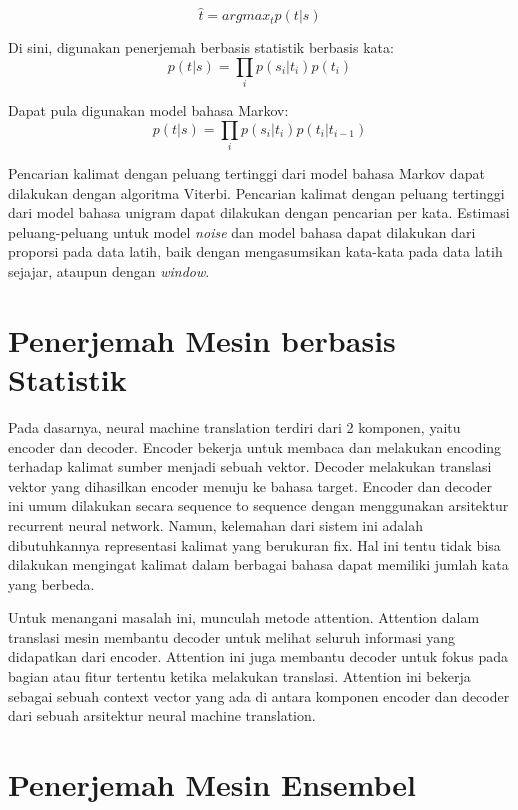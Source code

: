 \documentclass[conference]{IEEEtran}
\begin{document}
\begin{equation}
\hat{t} = argmax_t p(t|s)
\end{equation}

Di sini, digunakan penerjemah berbasis statistik berbasis kata:
\begin{equation}
p(t|s) = \prod_i p(s_i|t_i)p(t_i)
\end{equation}

Dapat pula digunakan model bahasa Markov:
\begin{equation}
p(t|s) = \prod_i p(s_i|t_i)p(t_i|t_{i-1})
\end{equation}

Pencarian kalimat dengan peluang tertinggi dari model bahasa Markov dapat dilakukan dengan algoritma Viterbi. Pencarian kalimat dengan peluang tertinggi dari model bahasa unigram dapat dilakukan dengan pencarian per kata. Estimasi peluang-peluang untuk model \textit{noise} dan model bahasa dapat dilakukan dari proporsi pada data latih, baik dengan mengasumsikan kata-kata pada data latih sejajar, ataupun dengan \textit{window}.

\section{Penerjemah Mesin berbasis Statistik}

Pada dasarnya, neural machine translation terdiri dari 2 komponen, yaitu encoder dan decoder. Encoder bekerja untuk membaca dan melakukan encoding terhadap kalimat sumber menjadi sebuah vektor. Decoder melakukan translasi vektor yang dihasilkan encoder menuju ke bahasa target. Encoder dan decoder ini umum dilakukan secara sequence to sequence dengan menggunakan arsitektur recurrent neural network. Namun, kelemahan dari sistem ini adalah dibutuhkannya representasi kalimat yang berukuran fix. Hal ini tentu tidak bisa dilakukan mengingat kalimat dalam berbagai bahasa dapat memiliki jumlah kata yang berbeda.

Untuk menangani masalah ini, munculah metode attention. Attention dalam translasi mesin membantu decoder untuk melihat seluruh informasi yang didapatkan dari encoder. Attention ini juga membantu decoder untuk fokus pada bagian atau fitur tertentu ketika melakukan translasi. Attention ini bekerja sebagai sebuah context vector yang ada di antara komponen encoder dan decoder dari sebuah arsitektur neural machine translation.

\section{Penerjemah Mesin Ensembel}
\end{document}
